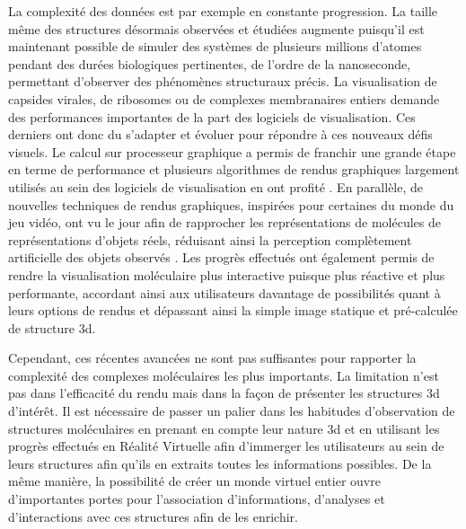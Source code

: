 La complexité des données est par exemple en constante progression. La taille même des structures désormais observées et étudiées augmente puisqu'il est maintenant possible de simuler des systèmes de plusieurs millions d'atomes pendant des durées biologiques pertinentes, de l'ordre de la nanoseconde, permettant d'observer des phénomènes structuraux précis. La visualisation de capsides virales, de ribosomes ou de complexes membranaires entiers demande des performances importantes de la part des logiciels de visualisation. Ces derniers ont donc du s'adapter et évoluer pour répondre à ces nouveaux défis visuels. Le calcul sur processeur graphique a permis de franchir une grande étape en terme de performance et plusieurs algorithmes de rendus graphiques largement utilisés au sein des logiciels de visualisation en ont profité \cite{chavent_gpu-powered_2011}. En parallèle, de nouvelles techniques de rendus graphiques, inspirées pour certaines du monde du jeu vidéo, ont vu le jour afin de rapprocher les représentations de molécules de représentations d'objets réels, réduisant ainsi la perception complètement artificielle des objets observés \cite{lv_game_2013}. Les progrès effectués ont également permis de rendre la visualisation moléculaire plus interactive puisque plus réactive et plus performante, accordant ainsi aux utilisateurs davantage de possibilités quant à leurs options de rendus et dépassant ainsi la simple image statique et pré-calculée de structure 3d.

Cependant, ces récentes avancées ne sont pas suffisantes pour rapporter la complexité des complexes moléculaires les plus importants. La limitation n'est pas dans l'efficacité du rendu mais dans la façon de présenter les structures 3d d'intérêt. Il est nécessaire de passer un palier dans les habitudes d'observation de structures moléculaires en prenant en compte leur nature 3d et en utilisant les progrès effectués en Réalité Virtuelle afin d'immerger les utilisateurs au sein de leurs structures afin qu'ils en extraits toutes les informations possibles. De la même manière, la possibilité de créer un monde virtuel entier ouvre d'importantes portes pour l'association d'informations, d'analyses et d'interactions avec ces structures afin de les enrichir. 

